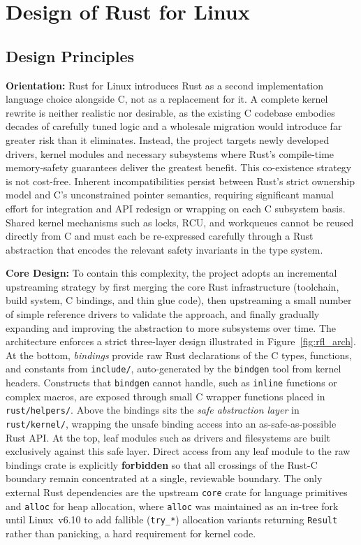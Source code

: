 \section{Design of Rust for Linux}

\subsection{Design Principles}

\textbf{Orientation:} Rust for Linux introduces Rust as a second implementation language choice alongside C, not as a replacement for it.
A complete kernel rewrite is neither realistic nor desirable, as the existing C codebase embodies decades of carefully tuned logic and a wholesale migration would introduce far greater risk than it eliminates.
Instead, the project targets newly developed drivers, kernel modules and necessary subsystems where Rust’s compile-time memory-safety guarantees deliver the greatest benefit. This co-existence strategy is not cost-free. Inherent incompatibilities persist between Rust’s strict ownership model and C’s unconstrained pointer semantics, requiring significant manual effort for integration and API redesign or wrapping on each C subsystem basis. Shared kernel mechanisms such as locks, RCU, and workqueues cannot be reused directly from C and must each be re-expressed carefully through a Rust abstraction that encodes the relevant safety invariants in the type system.

\textbf{Core Design:} To contain this complexity, the project adopts an incremental upstreaming strategy by first merging the core Rust infrastructure (toolchain, build system, C bindings, and thin glue code), then upstreaming a small number of simple reference drivers to validate the approach, and finally gradually expanding and improving the abstraction to more subsystems over time. 
The architecture enforces a strict three-layer design illustrated in Figure~\ref{fig:rfl_arch}.
At the bottom, \emph{bindings} provide raw Rust declarations of the C types,
functions, and constants from \texttt{include/}, auto-generated by the \texttt{bindgen} tool from kernel headers.
Constructs that \texttt{bindgen} cannot handle, such as \texttt{inline} functions or complex macros, are exposed through small C wrapper functions
placed in \texttt{rust/helpers/}.
Above the bindings sits the \emph{safe abstraction layer} in
\texttt{rust/kernel/}, wrapping the unsafe binding access into an
as-safe-as-possible Rust API.
At the top, leaf modules such as drivers and filesystems are built
exclusively against this safe layer.
Direct access from any leaf module to the raw bindings crate is explicitly
\textbf{forbidden} so that all crossings of the Rust-C boundary remain
concentrated at a single, reviewable boundary.
The only external Rust dependencies are the upstream \texttt{core} crate for
language primitives and \texttt{alloc} for heap allocation, where
\texttt{alloc} was maintained as an in-tree fork until Linux~v6.10 to add
fallible (\texttt{try\_*}) allocation variants returning \texttt{Result}
rather than panicking, a hard requirement for kernel code.

